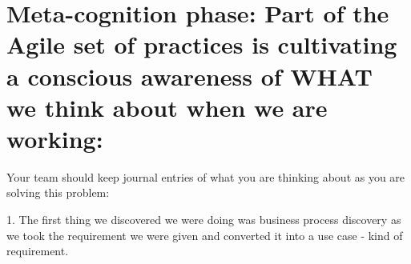\section{Meta-cognition phase: Part of the Agile set of practices is cultivating a conscious awareness of WHAT we think about when we are working: }

Your team should keep journal entries of what you are thinking about as you are solving this problem:

1. The first thing we discovered we were doing was business process discovery as we took the requirement we were given and converted it into a use case - kind of requirement.